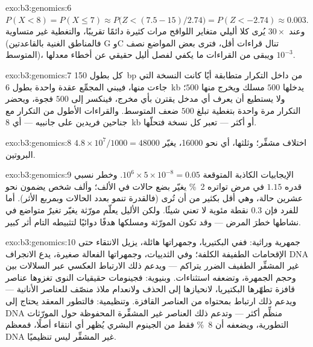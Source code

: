 \begin{solution}{exo:b3:genomics:6}
$P(X < 8) = P(X \le 7) \approx P\bigl(Z < (7.5 - 15)/2.74\bigr) =
P(Z < -2.74) \approx 0.003$. وعند $30\times$ يُرى كلا أليلي
متغاير اللواقح مرات كثيرة دائمًا تقريبًا، والتغطية غير متساوية
(فالمناطق الغنية بالقاعدتين G وC تنال قراءات أقل، فترى بعض المواضع نصف المتوسط)،
ويبقى من القراءات ما يكفي لفصل أليل حقيقي عن أخطاء
معدلها $10^{-3}$.
\end{solution}

\begin{solution}{exo:b3:genomics:7}
كل  بطول \qty{150}{bp} من داخل التكرار متطابقة أيًا كانت
النسخة التي جاءت منها، فيبني المجمِّع عقدة واحدة بطول \qty{6}{kb}
يدخلها $500$ مسلك ويخرج منها $500$؛ ولا يستطيع أن يعرف أي مدخل
يقترن بأي مخرج، فينكسر  إلى $500$ فجوة، ويحضر
التكرار مرة واحدة بتغطية تبلغ $500$ ضعف المتوسط. والقراءات الأطول
من التكرار مع جناحين فريدين على جانبيه --- أي \qty{8}{kb} أو
أكثر --- تعبر كل نسخة فتحلّها.
\end{solution}

\begin{solution}{exo:b3:genomics:8}
$4.8\times 10^{7}/1000 = \num{48000}$ اختلاف مشفِّر؛ وثلثها،
أي نحو \num{16000}، يغيّر البروتين.
\end{solution}

\begin{solution}{exo:b3:genomics:9}
الإيجابيات الكاذبة المتوقعة $10^{6}\times 5\times 10^{-8} = 0.05$. وخطر
نسبي قدره $1.15$ في مرض تواتره \qty{2}{\%} يغيّر بضع حالات
في الألف؛ وألف شخص يضمون نحو عشرين حالة، وهي أقل بكثير
من أن تُرى (فالقدرة تنمو بعدد الحالات وبمربع
الأثر). أما للفرد فإن $0.3$ نقطة مئوية
لا تعني شيئًا. ولكن الأليل يعلّم مورّثة يغيّر تغيرٌ متواضع في
نشاطها خطرَ المرض --- وقد تكون المورّثة ومسلكها هدفًا
دوائيًا لتثبيطه التام أثر كبير.
\end{solution}

\begin{solution}{exo:b3:genomics:10}
جمهرية وراثية: ففي البكتيريا، وجمهراتها هائلة، يزيل الانتقاء
حتى الإقحامات الطفيفة الكلفة؛ وفي الثدييات، وجمهراتها الفعالة
صغيرة، يدع الانجراف DNA غير المشفِّر الطفيف الضرر
يتراكم --- ويدعم ذلك الارتباط العكسي عبر السلالات
بين  وحجم الجمهرة، وتضعفه استثناءات.
وبنيوية: فجينومات حقيقيات النوى تغزوها عناصر قافزة تطهّرها
البكتيريا، لانحيازها إلى الحذف ولانعدام ملاذ منصّف
للعناصر الأنانية --- ويدعم ذلك ارتباط 
بمحتواه من العناصر القافزة. وتنظيمية: فالتطور المعقد يحتاج إلى
DNA منظِّم أكثر --- وتدعم ذلك العناصر غير المشفِّرة المحفوظة
حول المورّثات التطورية، ويضعفه أن
\qty{8}{\%} فقط من الجينوم البشري يُظهر أي انتقاء أصلًا، فمعظم
DNA غير المشفِّر ليس تنظيميًا.
\end{solution}

